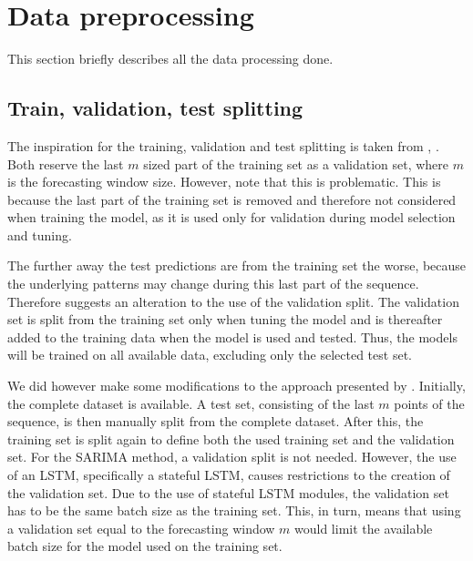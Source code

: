 \section{Data preprocessing}
\label{section:Method:Preprocessing}
This section briefly describes all the data processing done.

\subsection{Train, validation, test splitting}

The inspiration for the training, validation and test splitting is taken from
\cite{Bandara2019}, \cite{Hewamalage2021}.
Both reserve the last $m$ sized part of the training set as a validation set,
where $m$ is the forecasting window size.
However, \cite{Hewamalage2021} note that this is problematic.
This is because the last part of the training set is removed
and therefore not considered when training the model, as it is used only for validation during model selection and tuning.

The further away the test predictions are from the training set the worse,
because the underlying patterns may change during this last part of the sequence.
Therefore \cite{Hewamalage2021} suggests an alteration to the use of the validation split.
The validation set is split from the training set only when tuning the model
and is thereafter added to the training data when the model is used and tested.
Thus, the models will be trained on all available data, excluding only the selected test set.

We did however make some modifications to the approach presented by \cite{Hewamalage2021}.
Initially, the complete dataset is available.
A test set, consisting of the last $m$ points of the sequence, is then manually split from the complete dataset.
After this, the training set is split again to define both the used training set and the validation set.
For the SARIMA method, a validation split is not needed.
However, the use of an LSTM, specifically a stateful LSTM, causes restrictions to the creation of the validation set.
Due to the use of stateful LSTM modules, the validation set has to be the same batch size as the training set.
This, in turn, means that using a validation set equal to the forecasting window $m$ would limit the available batch size for the model
used on the training set.

